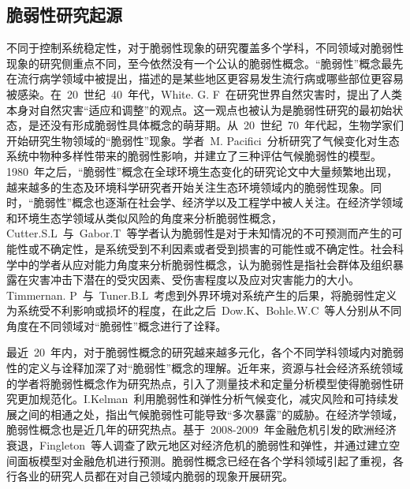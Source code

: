 \subsection{脆弱性研究起源}
不同于控制系统稳定性，对于脆弱性现象的研究覆盖多个学科，不同领域对脆弱性现象的研究侧重点不同，至今依然没有一个公认的脆弱性概念。“脆弱性”概念最先在流行病学领域中被提出\cite{Nkhuwa2003Human,Lili2010}，描述的是某些地区更容易发生流行病或哪些部位更容易被感染。在~20~世纪~40~年代，White. G. F~在研究世界自然灾害时，提出了人类本身对自然灾害“适应和调整”的观点\cite{GF1945}。这一观点也被认为是脆弱性研究的最初始状态，是还没有形成脆弱性具体概念的萌芽期。从~20~世纪~70~年代起，生物学家们开始研究生物领域的“脆弱性”现象。学者~M. Pacifici~分析研究了气候变化对生态系统中物种多样性带来的脆弱性影响，并建立了三种评估气候脆弱性的模型\cite{Miche2015}。1980~年之后，“脆弱性”概念在全球环境生态变化的研究论文中大量频繁地出现，越来越多的生态及环境科学研究者开始关注生态环境领域内的脆弱性现象。同时，“脆弱性”概念也逐渐在社会学、经济学以及工程学中被人关注。在经济学领域和环境生态学领域从类似风险的角度来分析脆弱性概念，Cutter.S.L~与~Gabor.T~等学者认为脆弱性是对于未知情况的不可预测而产生的可能性或不确定性，是系统受到不利因素或者受到损害的可能性或不确定性\cite{SL1996,TG1979}。社会科学中的学者从应对能力角度来分析脆弱性概念，认为脆弱性是指社会群体及组织暴露在灾害冲击下潜在的受灾因素、受伤害程度以及应对灾害能力的大小。Timmernan. P~与~Tuner.B.L~考虑到外界环境对系统产生的后果，将脆弱性定义为系统受不利影响或损坏的程度\cite{Toronto1981,TN2003}，在此之后~Dow.K、Bohle.W.C~等人分别从不同角度在不同领域对“脆弱性”概念进行了诠释\cite{K1992,WC1988}。

最近~20~年内，对于脆弱性概念的研究越来越多元化，各个不同学科领域内对脆弱性的定义与诠释加深了对“脆弱性”概念的理解。近年来，资源与社会经济系统领域的学者将脆弱性概念作为研究热点，引入了测量技术和定量分析模型使得脆弱性研究更加规范化。I.Kelman~利用脆弱性和弹性分析气候变化，减灾风险和可持续发展之间的相通之处，指出气候脆弱性可能导致“多次暴露”的威胁\cite{IK2015}。在经济学领域，脆弱性概念也是近几年的研究热点。基于~2008-2009~年金融危机引发的欧洲经济衰退，Fingleton~等人调查了欧元地区对经济危机的脆弱性和弹性，并通过建立空间面板模型对金融危机进行预测\cite{Fingleton2015}。脆弱性概念已经在各个学科领域引起了重视，各行各业的研究人员都在对自己领域内脆弱的现象开展研究。
